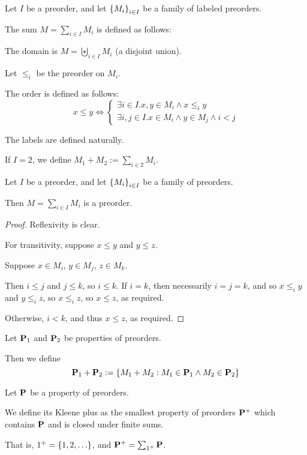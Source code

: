 \begin{definition}
  Let $I$ be a preorder, and let $\left\{ {M_i} \right\}_{i \in I}$ be a family of labeled preorders.

  The sum $M = \sum_{i \in I} M_i$ is defined as follows:

  The domain is $M = \biguplus_{i \in I} M_i$ (a disjoint union).

  Let $\le_i$ be the preorder on $M_i$.

  The order is defined as follows:
  \[
    x \le y \iff \begin{cases}
      \exists i \in I. x, y \in M_i \land x \le_i y \\
      \exists i, j \in I. x \in M_i \land y \in M_j \land i < j
    \end{cases}
  \]

  The labels are defined naturally.

  If $I = 2$, we define $M_1 + M_2 := \sum_{i \in 2} M_i$.
\end{definition}

\begin{lemma}
  Let $I$ be a preorder, and let $\left\{ {M_i} \right\}_{i \in I}$ be a family of preorders.

  Then $M = \sum_{i \in I} M_i$ is a preorder.
\end{lemma}

\begin{proof}
  Reflexivity is clear.

  For transitivity, suppose $x \le y$ and $y \le z$.

  Suppose $x \in M_i$, $y \in M_j$, $z \in M_k$.

  Then $i \le j$ and $j \le k$, so $i \le k$.
  If $i = k$, then necessarily $i = j = k$, and so $x \le_i y$ and $y \le_i z$,
  so $x \le_i z$, so $x \le z$, as required.

  Otherwise, $i < k$, and thus $x \le z$, as required.
\end{proof}

\begin{definition}
  Let $\mathbf{P}_1$ and $\mathbf{P}_2$ be properties of preorders.

  Then we define
  \[
    \mathbf{P}_1 + \mathbf{P}_2 := \left\{ {M_1 + M_2 : M_1 \in \mathbf{P}_1 \wedge M_2 \in \mathbf{P}_2} \right\}
  \]
\end{definition}

\begin{definition}
  Let $\mathbf{P}$ be a property of preorders.

  We define its Kleene plus as the smallest property of preorders $\mathbf{P}^+$ which contains $\mathbf{P}$ and is closed under
  finite sums.

  That is, $1^+ = \left\{ {1, 2, \ldots} \right\}$, and $\mathbf{P}^+ = \sum_{1^+}{\mathbf{P}}$.
\end{definition}


